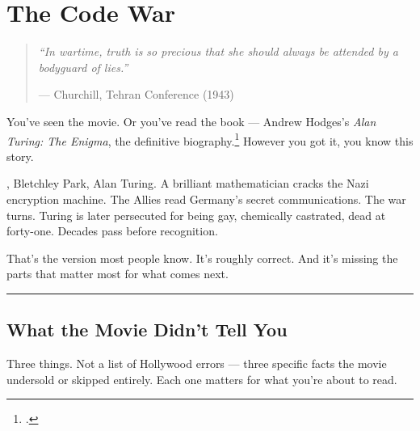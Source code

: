 
\chapter{The Code War}
\label{pos04:the-code-war}

\begin{quote}\small\textit{%
``In wartime, truth is so precious that she should always be attended by a bodyguard of lies.''%
}\par\raggedleft --- Churchill, Tehran Conference (1943)\end{quote}

\vspace{0.5cm}


You've seen the movie. Or you've read the book --- Andrew Hodges's \textit{Alan Turing: The Enigma}, the definitive biography.\footcite{hodges1983} However you got it, you know this story.%

, Bletchley Park, Alan Turing. A brilliant mathematician cracks the Nazi encryption machine. The Allies read Germany's secret communications. The war turns. Turing is later persecuted for being gay, chemically castrated, dead at forty-one. Decades pass before recognition.

That's the version most people know. It's roughly correct. And it's missing the parts that matter most for what comes next.

\vspace{1cm}\noindent\rule{0.5\textwidth}{0.5pt}\vspace{0.5cm}

\section*{What the Movie Didn't Tell You}
\label{pos04:what-the-movie-didnt-tell-you}

Three things. Not a list of Hollywood errors --- three specific facts the movie undersold or skipped entirely. Each one matters for what you're about to read.

